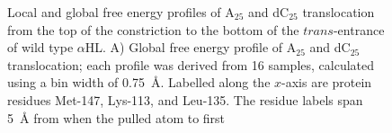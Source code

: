 \documentclass[a4paper,10pt]{article}
\newcommand{\dctf}{dC$_{25}$ }
\newcommand{\atf}{A$_{25}$ }
\newcommand{\ahl}{$\alpha$HL }
\newcommand{\ahlnsp}{$\alpha$HL}
\begin{document}
 \begin{figure}[!h]
  \begin{center}
    \end{center}
   \caption[Local and global free energy profiles of \atf and \dctf translocation from the top of the constriction to the bottom of the $trans$-entrance of wild type \ahl]{Local and global free energy profiles of \atf and \dctf translocation from the top of the constriction to the bottom of the $trans$-entrance of wild type \ahlnsp. A) Global free energy profile of \atf and \dctf
translocation; each profile was derived from 16 samples, calculated using a bin width of 0.75~{\AA}. Labelled along the $x$-axis are protein residues Met-147, Lys-113, and Leu-135. The residue labels span 5~{\AA} from when the pulled atom to first
}
\end{figure}
\end{document}
